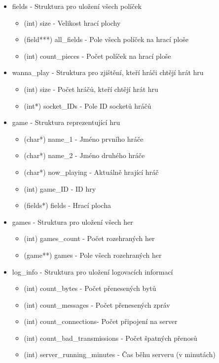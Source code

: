 \documentclass[12pt, a4paper]{article}
\begin{document}
\begin{itemize}
\begin{itemize}
	\end{itemize}	 
\item fields - Struktura pro uložení všech políček
	\begin{itemize}
	\item (int) size - Velikost hrací plochy
	\item (field***) all\_fields - Pole všech políček na hrací ploše
	\item (int) count\_pieces - Počet políček na hrací ploše 
	\end{itemize}	 
\item wanna\_play - Struktura pro zjištění, kteří hráči chtějí hrát hru
	\begin{itemize}
	\item (int) size - Počet hráčů, kteří chtějí hrát hru
	\item (int*) socket\_IDs - Pole ID socketů hráčů
	\end{itemize}	 
\item game - Struktura reprezentující hru
	\begin{itemize}
	\item (char*) name\_1 - Jméno prvního hráče
	\item (char*) name\_2 - Jméno druhého hráče
	\item (char*) now\_playing - Aktuálně hrající hráč
	\item (int) game\_ID - ID hry
	\item (fields*) fields - Hrací plocha
	\end{itemize}	 
\item games - Struktura pro uložení všech her
	\begin{itemize}
	\item (int) games\_count - Počet rozehraných her
	\item (game**) games - Pole všech rozehraných her
	\end{itemize}	 
\item log\_info - Struktura pro uložení logovacích informací
	\begin{itemize}
	\item (int) count\_bytes - Počet přenesených bytů
	\item (int) count\_messages - Počet přenesených zpráv
	\item (int) count\_connections- Počet připojení na server
	\item (int) count\_bad\_transmissions - Počet špatných přenosů
	\item (int) server\_running\_minutes - Čas běhu serveru (v minutách)
	\end{itemize}	 
\end{itemize}
\newpage
\end{document}
